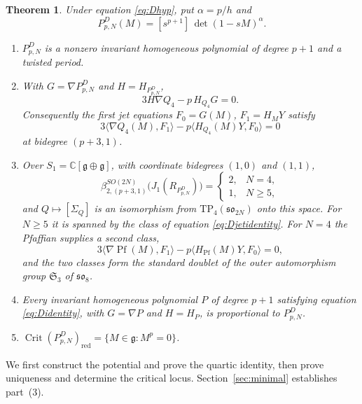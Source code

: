 \documentclass[10pt,reqno]{amsart}
\numberwithin{equation}{section}
\theoremstyle{plain}
\newtheorem{theorem}{Theorem}[section]
\theoremstyle{definition}
\newcommand{\Sym}{\mathfrak{S}}
\DeclareMathOperator{\Crit}{Crit}
\DeclareMathOperator{\Pf}{Pf}
\newcommand{\red}{\mathrm{red}}
\newcommand{\TP}{\mathrm{TP}}
\newcommand{\ip}[2]{\langle #1, #2\rangle}
\begin{document}
\begin{theorem}\label{thm:typeD}
Under equation \eqref{eq:Dhyp}, put $\alpha=p/h$ and
\begin{equation}\label{eq:PD}
	P^D_{p,N}(M)=[s^{p+1}]\,\det(1-sM)^\alpha .
\end{equation}
\begin{enumerate}[label=(\arabic*)]
\item $P^D_{p,N}$ is a nonzero invariant homogeneous polynomial of degree $p+1$ and a twisted period.
\item With $G=\nabla P^D_{p,N}$ and $H=H_{P^D_{p,N}}$,
\begin{equation}\label{eq:Didentity}
	3H\nabla Q_4-p\,H_{Q_4}G=0 .
\end{equation}
Consequently the first jet equations $F_0=G(M)$, $F_1=H_MY$ satisfy
\begin{equation}\label{eq:Djetidentity}
	3\ip{\nabla Q_4(M)}{F_1}-p\ip{H_{Q_4}(M)Y}{F_0}=0
\end{equation}
at bidegree $(p+3,1)$.
\item Over $S_1=\mathbb{C}[\mathfrak{g}\oplus\mathfrak{g}]$, with coordinate bidegrees $(1,0)$ and $(1,1)$,
\begin{equation}\label{eq:Dbetti}
	\beta^{SO(2N)}_{2,(p+3,1)}\big(J_1(R_{P^D_{p,N}})\big)=\begin{cases}2,&N=4,\\1,&N\ge5,\end{cases}
\end{equation}
and $Q\mapsto[\Sigma_Q]$ is an isomorphism from $\TP_4(\mathfrak{so}_{2N})$ onto this space. For $N\ge5$ it is spanned by the class of equation \eqref{eq:Djetidentity}. For $N=4$ the Pfaffian supplies a second class,
\begin{equation}\label{eq:DPfidentity}
	3\ip{\nabla\Pf(M)}{F_1}-p\ip{H_{\Pf}(M)Y}{F_0}=0,
\end{equation}
and the two classes form the standard doublet of the outer automorphism group $\Sym_3$ of $\mathfrak{so}_8$.
\item Every invariant homogeneous polynomial $P$ of degree $p+1$ satisfying equation \eqref{eq:Didentity}, with $G=\nabla P$ and $H=H_P$, is proportional to $P^D_{p,N}$.
\item $\Crit(P^D_{p,N})_\red=\{M\in\mathfrak{g}:M^p=0\}$.
\end{enumerate}
\end{theorem}

We first construct the potential and prove the quartic identity, then prove uniqueness and determine the critical locus. Section~\ref{sec:minimal} establishes part~(3).
\end{document}
